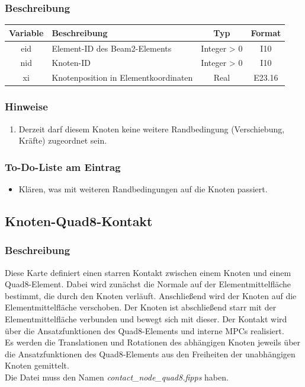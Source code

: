 \documentclass[11pt,titlepage,listof=totoc,bibliography=totoc,twoside]{scrreprt}
\begin{document}
{{\subsubsection{Beschreibung}

\begin{tabularx}{\textwidth}{cXcc}
\toprule
Variable& Beschreibung				& Typ		& Format\\
\midrule
eid	& Element-ID des Beam2-Elements		& Integer > 0	& I10	\\
nid	& Knoten-ID				& Integer > 0	& I10	\\
xi	& Knotenposition in Elementkoordinaten	& Real		& E23.16	\\
\bottomrule
\end{tabularx}

\subsubsection{Hinweise}

\begin{enumerate}
\item Derzeit darf diesem Knoten keine weitere Randbedingung (Verschiebung, Kräfte) zugeordnet sein.
\end{enumerate}

\subsubsection{To-Do-Liste am Eintrag}

\begin{itemize}
\item Klären, was mit weiteren Randbedingungen auf die Knoten passiert.
\end{itemize}

\newpage

\subsection{Knoten-Quad8-Kontakt}

\subsubsection{Beschreibung}

Diese Karte definiert einen starren Kontakt zwischen einem Knoten und einem Quad8-Element. Dabei wird zunächst die Normale auf der Elementmittelfläche bestimmt, die durch den Knoten verläuft. Anschließend wird der Knoten auf die Elementmittelfläche verschoben. Der Knoten ist abschließend starr mit der Elementmittelfläche verbunden und bewegt sich mit dieser. Der Kontakt wird über die Ansatzfunktionen des Quad8-Elements und interne MPCs realisiert.\\
Es werden die Translationen und Rotationen des abhängigen Knoten jeweils über die Ansatzfunktionen des Quad8-Elements aus den Freiheiten der unabhängigen Knoten gemittelt.\\
Die Datei muss den Namen \emph{contact\_node\_quad8.fipps} haben.

}}
\end{document}
